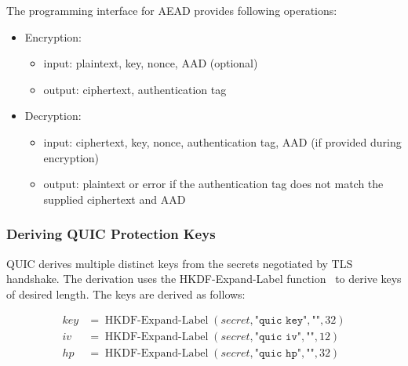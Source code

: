 The programming interface for AEAD provides following operations:

\begin{itemize}

  \item Encryption:

  \begin{itemize}

    \item input: plaintext, key, nonce, AAD (optional)

    \item output: ciphertext, authentication tag

  \end{itemize}

  \item Decryption:

  \begin{itemize}

    \item input: ciphertext, key, nonce, authentication tag, AAD (if provided during encryption)

    \item output: plaintext or error if the authentication tag does not match the supplied
      ciphertext and AAD

  \end{itemize}

\end{itemize}

\subsubsection{Deriving QUIC Protection Keys}\label{sec:02-encryption-key-derivation}

QUIC derives multiple distinct keys from the secrets negotiated by TLS handshake. The derivation
uses the HKDF-Expand-Label function~\cite{rfc5869} to derive keys of desired length. The keys are
derived as follows:

\begin{equation*}
  \begin{split}
  key & = \operatorname{HKDF-Expand-Label}(secret, \texttt{"quic key"}, \texttt{""}, 32) \\
  iv  & = \operatorname{HKDF-Expand-Label}(secret, \texttt{"quic iv"}, \texttt{""}, 12)  \\
  hp  & = \operatorname{HKDF-Expand-Label}(secret, \texttt{"quic hp"}, \texttt{""}, 32)  \\
  \end{split}
\end{equation*}

